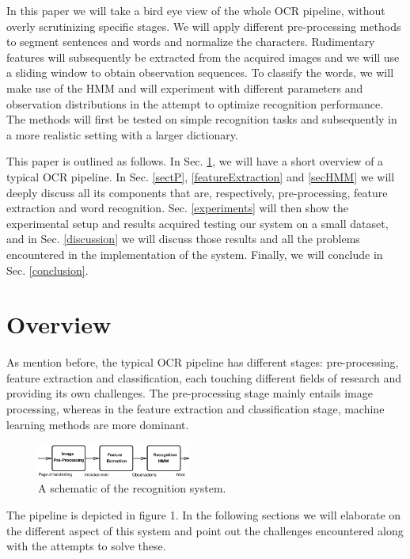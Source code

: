 \documentclass[conference]{IEEEtran}
\begin{document}
In this paper we will take a bird eye view of the whole OCR pipeline, without overly scrutinizing specific stages. We will apply different pre-processing methods to segment sentences and words and normalize the characters. Rudimentary features will subsequently be extracted from the acquired images and we will use a sliding window to obtain observation sequences. To classify the words, we will make use of the HMM and will experiment with different parameters and observation distributions in the attempt to optimize recognition performance. The methods will first be tested on simple recognition tasks and subsequently in a more realistic setting with a larger dictionary.

This paper is outlined as follows. In Sec. \ref{overview}, we will have a short overview of a typical OCR pipeline. In Sec.  \ref{sectP},  \ref{featureExtraction}  and \ref{secHMM} we will deeply discuss all its components that are, respectively, pre-processing, feature extraction and word recognition. Sec. \ref{experiments} will then show the experimental setup and results acquired testing our system on a small dataset, and in Sec. \ref{discussion} we will discuss those results and all the problems encountered in the implementation of the system. Finally, we will conclude in Sec. \ref{conclusion}.\\

\section{Overview} \label{overview}
As mention before, the typical OCR pipeline has different stages: pre-processing, feature extraction and classification, each touching different fields of research and providing its own challenges. The pre-processing stage mainly entails image processing, whereas in the feature extraction and classification stage, machine learning methods are more dominant.
\begin{figure}
 \centering
\includegraphics[width=0.45\textwidth]{pipeline.png}
\caption{A schematic of the recognition system.}
\label{fig:pipeline}
\end{figure}
The pipeline is depicted in figure 1. In the following sections we will elaborate on the different aspect of this system and point out the challenges encountered along with the attempts to solve these.
\end{document}
